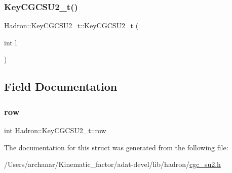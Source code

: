\mbox{\label{structHadron_1_1KeyCGCSU2__t_abe46c2e3bffc2fd9818d7da7c91983cc}} 
\subsubsection{\texorpdfstring{KeyCGCSU2\_t()}{KeyCGCSU2\_t()}\hspace{0.1cm}{\footnotesize\ttfamily [6/6]}}
{\footnotesize\ttfamily Hadron\+::\+Key\+C\+G\+C\+S\+U2\+\_\+t\+::\+Key\+C\+G\+C\+S\+U2\+\_\+t (\begin{DoxyParamCaption}\item[{int}]{l }\end{DoxyParamCaption})\hspace{0.3cm}{\ttfamily [inline]}}



\subsection{Field Documentation}
\mbox{\label{structHadron_1_1KeyCGCSU2__t_a96e0da2b64dff83f72b594bc4fef5c75}} 
\subsubsection{\texorpdfstring{row}{row}}
{\footnotesize\ttfamily int Hadron\+::\+Key\+C\+G\+C\+S\+U2\+\_\+t\+::row}



The documentation for this struct was generated from the following file\+:\begin{DoxyCompactItemize}
\item 
/\+Users/archanar/\+Kinematic\+\_\+factor/adat-\/devel/lib/hadron/\mbox{\hyperlink{adat-devel_2lib_2hadron_2cgc__su2_8h}{cgc\+\_\+su2.\+h}}\end{DoxyCompactItemize}
